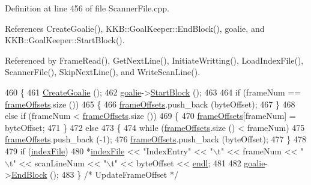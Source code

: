 Definition at line 456 of file Scanner\+File.\+cpp.



References Create\+Goalie(), K\+K\+B\+::\+Goal\+Keeper\+::\+End\+Block(), goalie, and K\+K\+B\+::\+Goal\+Keeper\+::\+Start\+Block().



Referenced by Frame\+Read(), Get\+Next\+Line(), Initiate\+Writting(), Load\+Index\+File(), Scanner\+File(), Skip\+Next\+Line(), and Write\+Scan\+Line().


\begin{DoxyCode}
460 \{
461   \hyperlink{class_k_k_l_s_c_1_1_scanner_file_a08e1b410a871d7dae4828143cec78c32}{CreateGoalie} ();
462   \hyperlink{class_k_k_l_s_c_1_1_scanner_file_aea946a2d0dc2fb27b41ce5180679d3de}{goalie}->\hyperlink{class_k_k_b_1_1_goal_keeper_a2a9565f88cee7b4339c24ed4d5155419}{StartBlock} ();
463 
464   \textcolor{keywordflow}{if}  (frameNum == \hyperlink{class_k_k_l_s_c_1_1_scanner_file_a61d36c66bb5f16ba82c088cd816b0c68}{frameOffsets}.size ())
465   \{
466     \hyperlink{class_k_k_l_s_c_1_1_scanner_file_a61d36c66bb5f16ba82c088cd816b0c68}{frameOffsets}.push\_back (byteOffset);
467   \}
468   \textcolor{keywordflow}{else} \textcolor{keywordflow}{if}  (frameNum < \hyperlink{class_k_k_l_s_c_1_1_scanner_file_a61d36c66bb5f16ba82c088cd816b0c68}{frameOffsets}.size ())
469   \{
470     \hyperlink{class_k_k_l_s_c_1_1_scanner_file_a61d36c66bb5f16ba82c088cd816b0c68}{frameOffsets}[frameNum] = byteOffset;
471   \}
472   \textcolor{keywordflow}{else}
473   \{
474     \textcolor{keywordflow}{while}  (\hyperlink{class_k_k_l_s_c_1_1_scanner_file_a61d36c66bb5f16ba82c088cd816b0c68}{frameOffsets}.size () < frameNum)
475       \hyperlink{class_k_k_l_s_c_1_1_scanner_file_a61d36c66bb5f16ba82c088cd816b0c68}{frameOffsets}.push\_back (-1);
476     \hyperlink{class_k_k_l_s_c_1_1_scanner_file_a61d36c66bb5f16ba82c088cd816b0c68}{frameOffsets}.push\_back (byteOffset);
477   \}
478 
479   \textcolor{keywordflow}{if}  (\hyperlink{class_k_k_l_s_c_1_1_scanner_file_aa82349c3a370d33508267b609e543f44}{indexFile})
480     *\hyperlink{class_k_k_l_s_c_1_1_scanner_file_aa82349c3a370d33508267b609e543f44}{indexFile} << \textcolor{stringliteral}{"IndexEntry"} << \textcolor{stringliteral}{"\(\backslash\)t"} << frameNum << \textcolor{stringliteral}{"\(\backslash\)t"} << scanLineNum << \textcolor{stringliteral}{"\(\backslash\)t"} << byteOffset <<
       \hyperlink{namespace_k_k_b_ad1f50f65af6adc8fa9e6f62d007818a8}{endl};
481 
482   \hyperlink{class_k_k_l_s_c_1_1_scanner_file_aea946a2d0dc2fb27b41ce5180679d3de}{goalie}->\hyperlink{class_k_k_b_1_1_goal_keeper_aee88d11d3466dd77ef3e5b18c87e27fb}{EndBlock} ();
483 \}  \textcolor{comment}{/* UpdateFrameOffset */}
\end{DoxyCode}
